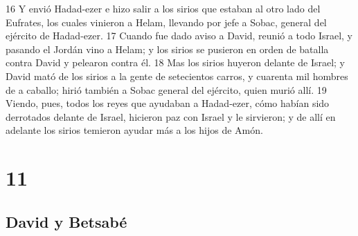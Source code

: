 16 Y envió Hadad-ezer e hizo salir a los sirios que estaban al otro lado del Eufrates, los cuales vinieron a Helam, llevando por jefe a Sobac, general del ejército de Hadad-ezer.
17 Cuando fue dado aviso a David, reunió a todo Israel, y pasando el Jordán vino a Helam; y los sirios se pusieron en orden de batalla contra David y pelearon contra él.
18 Mas los sirios huyeron delante de Israel; y David mató de los sirios a la gente de setecientos carros, y cuarenta mil hombres de a caballo; hirió también a Sobac general del ejército, quien murió allí.
19 Viendo, pues, todos los reyes que ayudaban a Hadad-ezer, cómo habían sido derrotados delante de Israel, hicieron paz con Israel y le sirvieron; y de allí en adelante los sirios temieron ayudar más a los hijos de Amón.

\chapter{11}

\section*{David y Betsabé}


